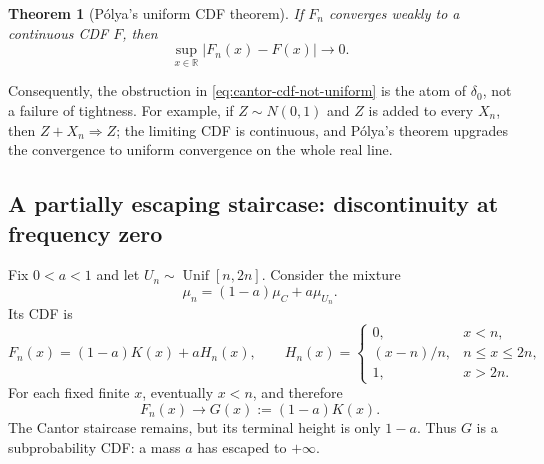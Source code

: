 \documentclass[10pt,a4paper]{article}
\numberwithin{equation}{section}
\theoremstyle{blueplain}
\newtheorem{theorem}{Theorem}[section]
\theoremstyle{definition}
\newcommand{\R}{\mathbb R}
\begin{document}
\begin{theorem}[P\'olya's uniform CDF theorem]
If \(F_n\) converges weakly to a continuous CDF \(F\), then
\[
  \sup_{x\in\R}|F_n(x)-F(x)|\longrightarrow0.
\]
\end{theorem}

Consequently, the obstruction in \eqref{eq:cantor-cdf-not-uniform} is the atom
of \(\delta_0\), not a failure of tightness.  For example, if \(Z\sim N(0,1)\)
and \(Z\) is added to every \(X_n\), then \(Z+X_n\Rightarrow Z\); the limiting
CDF is continuous, and P\'olya's theorem upgrades the convergence to uniform
convergence on the whole real line.

\subsection{A partially escaping staircase: discontinuity at frequency zero}

Fix \(0<a<1\) and let \(U_n\sim\operatorname{Unif}[n,2n]\).  Consider the
mixture
\begin{equation}
  \mu_n=(1-a)\mu_C+a\mu_{U_n}.
  \label{eq:escaping-mixture}
\end{equation}
Its CDF is
\begin{equation}
  F_n(x)=(1-a)K(x)+aH_n(x),
  \qquad
  H_n(x)=
  \begin{cases}
    0,&x<n,\\
    (x-n)/n,&n\le x\le2n,\\
    1,&x>2n.
  \end{cases}
  \label{eq:escaping-mixture-cdf}
\end{equation}
For each fixed finite \(x\), eventually \(x<n\), and therefore
\begin{equation}
  F_n(x)\longrightarrow G(x):=(1-a)K(x).
  \label{eq:defective-cdf-limit}
\end{equation}
The Cantor staircase remains, but its terminal height is only \(1-a\).
Thus \(G\) is a subprobability CDF: a mass \(a\) has escaped to \(+\infty\).
\end{document}
